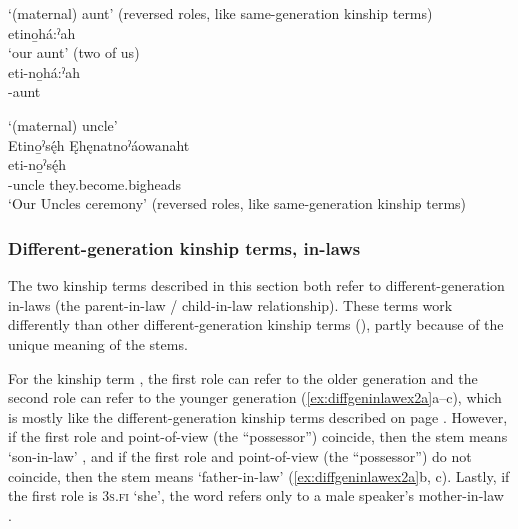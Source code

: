 \ea\label{ex:interkintermppex16a}  ‘(maternal) aunt’ (reversed roles, like same-generation kinship terms)\\
etino̱há:ˀah\\
\glt ‘our aunt’ (two of us)\\
\gll eti-no̱há:ˀah\\
-aunt\\
\z


\ea\label{ex:interkintermppex85}
 ‘(maternal) uncle’ \\

\glll Etino̱ˀsę́h Ęhęnatnoˀáowanaht\\
eti-no̱ˀsę́h {}\\ 
  -uncle they.become.bigheads\\
\glt ‘Our Uncles ceremony’ (reversed roles, like same-generation kinship terms)\\

\z



\subsubsection*{Different-generation kinship terms, in-laws} \label{ch:Different-generation kinship terms, in-laws}
The two kinship terms described in this section both refer to different-generation in-laws (the parent-in-law / child-in-law relationship). These terms work differently than other different-generation kinship terms (), partly because of the unique meaning of the stems. 

For the kinship term , the first role can refer to the older generation and the second role can refer to the younger generation (\ref{ex:diffgeninlawex2a}a--c), which is mostly like the different-generation kinship terms described on page \pageref{ch:Different-generations kinship terms, interactive pronominal prefixes}. However, if the first role and point-of-view (the “possessor”) coincide, then the stem means ‘son-in-law’ , and if the first role and point-of-view (the “possessor”) do not coincide, then the stem means ‘father-in-law’ (\ref{ex:diffgeninlawex2a}b, c). Lastly, if the first role is \textsc{3s.fi} ‘she’, the word refers only to a male speaker’s mother-in-law .

